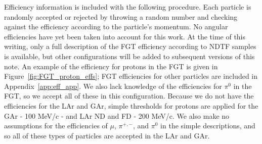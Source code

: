 \documentclass[12pt]{article}
\begin{document}
Efficiency information is included with the following procedure. Each particle is randomly accepted or rejected by throwing a random number and checking against the efficiency according to the particle's momentum. No angular efficiencies have yet been taken into account for this work. At the time of this writing, only a full description of the FGT efficiency according to NDTF samples is available, but other configurations will be added to subsequent versions of this note. An example of the efficiency for protons in the FGT is given in Figure~\ref{fig:FGT_proton_effs}; FGT efficiencies for other particles are included in Appendix~\ref{app:eff_app}. We also lack knowledge of the efficiencies for $\pi^0$ in the FGT, so we accept all of these in this configuration. Because we do not have the efficiencies for the LAr and GAr, simple thresholds for protons are applied for the GAr - 100 MeV/c - and LAr ND and FD - 200 MeV/c. We also make no assumptions for the efficiencies of $\mu$, $\pi^{+,-}$, and $\pi^{0}$ in the simple  descriptions, and so all of these types of particles are accepted in the LAr and GAr.
\end{document}
